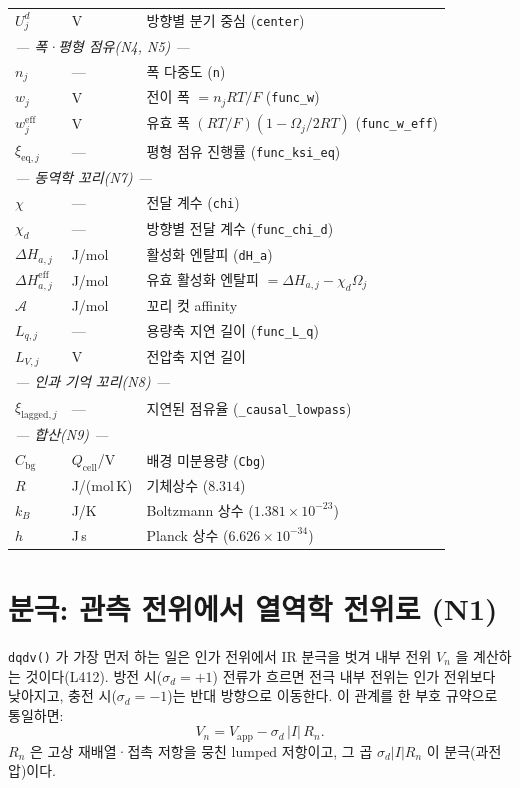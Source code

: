 \documentclass[11pt,a4paper]{article}
\newcommand{\eff}{\mathrm{eff}}
\newcommand{\eq}{\mathrm{eq}}
\newcommand{\app}{\mathrm{app}}
\newcommand{\cell}{\mathrm{cell}}
\newcommand{\bg}{\mathrm{bg}}
\begin{document}
\begin{longtable}{p{} p{} p{}}
$U_j^d$ & V & 방향별 분기 중심 (\texttt{center})\\
\multicolumn{3}{l}{\emph{--- 폭·평형 점유(N4, N5) ---}}\\
$n_j$ & --- & 폭 다중도 (\texttt{n})\\
$w_j$ & V & 전이 폭 $=n_jRT/F$ (\texttt{func\_w})\\
$w_j^\eff$ & V & 유효 폭 $(RT/F)(1-\Omega_j/2RT)$ (\texttt{func\_w\_eff})\\
$\xi_{\eq,j}$ & --- & 평형 점유 진행률 (\texttt{func\_ksi\_eq})\\
\multicolumn{3}{l}{\emph{--- 동역학 꼬리(N7) ---}}\\
$\chi$ & --- & 전달 계수 (\texttt{chi})\\
$\chi_d$ & --- & 방향별 전달 계수 (\texttt{func\_chi\_d})\\
$\Delta H_{a,j}$ & J/mol & 활성화 엔탈피 (\texttt{dH\_a})\\
$\Delta H_{a,j}^\eff$ & J/mol & 유효 활성화 엔탈피 $=\Delta H_{a,j}-\chi_d\Omega_j$\\
$\mathcal{A}$ & J/mol & 꼬리 컷 affinity\\
$L_{q,j}$ & --- & 용량축 지연 길이 (\texttt{func\_L\_q})\\
$L_{V,j}$ & V & 전압축 지연 길이\\
\multicolumn{3}{l}{\emph{--- 인과 기억 꼬리(N8) ---}}\\
$\xi_{\mathrm{lagged},j}$ & --- & 지연된 점유율 (\texttt{\_causal\_lowpass})\\
\multicolumn{3}{l}{\emph{--- 합산(N9) ---}}\\
$C_\bg$ & $Q_\cell$/V & 배경 미분용량 (\texttt{Cbg})\\
$R$ & J/(mol\,K) & 기체상수 ($8.314$)\\
$k_B$ & J/K & Boltzmann 상수 ($1.381\times10^{-23}$)\\
$h$ & J\,s & Planck 상수 ($6.626\times10^{-34}$)\\
\bottomrule
\end{longtable}

\section{분극: 관측 전위에서 열역학 전위로 (N1)}\label{sec:polar}

\texttt{dqdv()} 가 가장 먼저 하는 일은 인가 전위에서 IR 분극을 벗겨 내부 전위
$V_n$ 을 계산하는 것이다(L412). 방전 시($\sigma_d=+1$) 전류가 흐르면 전극 내부
전위는 인가 전위보다 낮아지고, 충전 시($\sigma_d=-1$)는 반대 방향으로 이동한다.
이 관계를 한 부호 규약으로 통일하면:
\begin{equation}
\boxed{V_n = V_\app - \sigma_d\,|I|\,R_n.}
\label{eq:vn}
\end{equation}
$R_n$ 은 고상 재배열·접촉 저항을 뭉친 lumped 저항이고, 그 곱 $\sigma_d|I|R_n$ 이
분극(과전압)이다.
\end{document}
